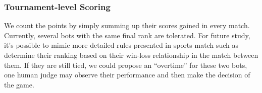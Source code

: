 
\subsubsection*{Tournament-level Scoring}
We count the points by simply summing up their scores gained in every match. Currently, several bots with the same final rank are tolerated. For future study, it's possible to mimic more detailed rules presented in sports match such as determine their ranking based on their win-loss relationship in the match between them.  
If they are still tied, we could propose an “overtime” for these two bots, one human judge may observe their performance and then make the decision of the game.
